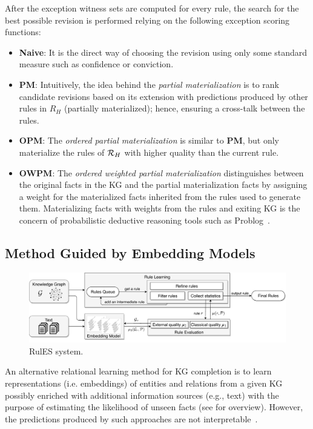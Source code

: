 After the exception witness sets are computed for every rule, the search for the best possible revision is performed relying on the following exception scoring functions:
\begin{itemize}
\item \textbf{Naive}: It is the direct way of choosing the revision using only some standard measure such as confidence or conviction.
\item \textbf{PM}: Intuitively, the idea behind the \textit{partial materialization} is to rank candidate revisions based on its extension with predictions produced by other rules in $R_H$ (\ie partially materialized); hence, ensuring a cross-talk between the rules.
\item \textbf{OPM}: The \textit{ordered partial materialization} is similar to \textbf{PM}, but only materialize the rules of $\mathcal{R}_{H}$ with higher quality than the current rule.
\item \textbf{OWPM}: The \textit{ordered weighted partial materialization} distinguishes between the original facts in the KG and the partial materialization facts by assigning a weight for the materialized facts inherited from the rules used to generate them. Materializing facts with weights from the rules and exiting KG is the concern of probabilistic deductive reasoning tools such as Problog~\cite{problog2007,problog2015}. %
\end{itemize}



\subsection{Method Guided by Embedding Models}
  \begin{figure}[t]
\centering
\includegraphics[width=1\textwidth]{figures/rules_overview_H.pdf}
\caption{RulES system.}
\label{fig:system}
\end{figure}


An alternative relational learning method for KG completion is to learn representations (i.e. embeddings) of entities and relations from a given KG possibly enriched with additional information sources (e.g., text) with the purpose of estimating the likelihood of unseen facts (see \cite{Wang2017} for overview). However, the predictions produced by such approaches are not interpretable~\cite{Shakerin2018}. 

